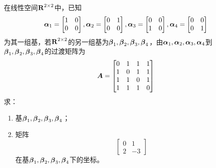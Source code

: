 \begin{problem}
在线性空间\(\boldsymbol{\mathrm{R}}^{2\times2}\)中，已知
\begin{equation*}
    \boldsymbol{\alpha}_1=\begin{bmatrix}1&0\\0&0\end{bmatrix},
    \boldsymbol{\alpha}_2=\begin{bmatrix}0&1\\0&0\end{bmatrix},
    \boldsymbol{\alpha}_3=\begin{bmatrix}0&0\\1&0\end{bmatrix},
    \boldsymbol{\alpha}_4=\begin{bmatrix}0&0\\0&1\end{bmatrix}
\end{equation*}
为其一组基，若\(\boldsymbol{\mathrm{R}}^{2\times2}\)的另一组基为\(\boldsymbol{\beta}_1,\boldsymbol{\beta}_2,\boldsymbol{\beta}_3,\boldsymbol{\beta}_4\)，由\(\boldsymbol{\alpha}_1,\boldsymbol{\alpha}_2,\boldsymbol{\alpha}_3,\boldsymbol{\alpha}_4\)到\(\boldsymbol{\beta}_1,\boldsymbol{\beta}_2,\boldsymbol{\beta}_3,\boldsymbol{\beta}_4\)的过渡矩阵为
\begin{equation*}
    \boldsymbol{A}=
    \begin{bmatrix}
        0 & 1 & 1 & 1 \\
        1 & 0 & 1 & 1 \\
        1 & 1 & 0 & 1 \\
        1 & 1 & 1 & 0
    \end{bmatrix}
\end{equation*}
求：
\begin{enumerate}
    \item 基\(\boldsymbol{\beta}_1,\boldsymbol{\beta}_2,\boldsymbol{\beta}_3,\boldsymbol{\beta}_4\)；
    \item 矩阵\begin{equation*}\begin{bmatrix}0&1\\2&-3\end{bmatrix}\end{equation*}在基\(\boldsymbol{\beta}_1,\boldsymbol{\beta}_2,\boldsymbol{\beta}_3,\boldsymbol{\beta}_4\)下的坐标。
\end{enumerate}
\end{problem}
